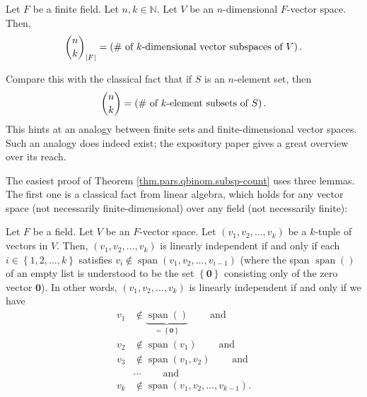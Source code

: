 \begin{theorem}
\label{thm.pars.qbinom.subsp-count}Let $F$ be a finite field. Let
$n,k\in\mathbb{N}$. Let $V$ be an $n$-dimensional $F$-vector space. Then,%
\[
\dbinom{n}{k}_{\left\vert F\right\vert }=\left(  \text{\# of }%
k\text{-dimensional vector subspaces of }V\right)  .
\]

\end{theorem}

Compare this with the classical fact that if $S$ is an $n$-element set, then%
\[
\dbinom{n}{k}=\left(  \text{\# of }k\text{-element subsets of }S\right)  .
\]
This hints at an analogy between finite sets and finite-dimensional vector
spaces. Such an analogy does indeed exist; the expository paper \cite{Cohn04}
gives a great overview over its reach.

The easiest proof of Theorem \ref{thm.pars.qbinom.subsp-count} uses three
lemmas. The first one is a classical fact from linear algebra, which holds for
any vector space (not necessarily finite-dimensional) over any field (not
necessarily finite):

\begin{lemma}
\label{lem.linalg.lin-ind-via-span}Let $F$ be a field. Let $V$ be an
$F$-vector space. Let $\left(  v_{1},v_{2},\ldots,v_{k}\right)  $ be a
$k$-tuple of vectors in $V$. Then, $\left(  v_{1},v_{2},\ldots,v_{k}\right)  $
is linearly independent if and only if each $i\in\left\{  1,2,\ldots
,k\right\}  $ satisfies $v_{i}\notin\operatorname*{span}\left(  v_{1}%
,v_{2},\ldots,v_{i-1}\right)  $ (where the span $\operatorname*{span}\left(
{}\right)  $ of an empty list is understood to be the set $\left\{
\mathbf{0}\right\}  $ consisting only of the zero vector $\mathbf{0}$). In
other words, $\left(  v_{1},v_{2},\ldots,v_{k}\right)  $ is linearly
independent if and only if we have%
\begin{align*}
v_{1}  &  \notin\underbrace{\operatorname*{span}\left(  {}\right)
}_{=\left\{  \mathbf{0}\right\}  }\ \ \ \ \ \ \ \ \ \ \text{and}\\
v_{2}  &  \notin\operatorname*{span}\left(  v_{1}\right)
\ \ \ \ \ \ \ \ \ \ \text{and}\\
v_{3}  &  \notin\operatorname*{span}\left(  v_{1},v_{2}\right)
\ \ \ \ \ \ \ \ \ \ \text{and}\\
&  \cdots\ \ \ \ \ \ \ \ \ \ \text{and}\\
v_{k}  &  \notin\operatorname*{span}\left(  v_{1},v_{2},\ldots,v_{k-1}\right)
.
\end{align*}

\end{lemma}

